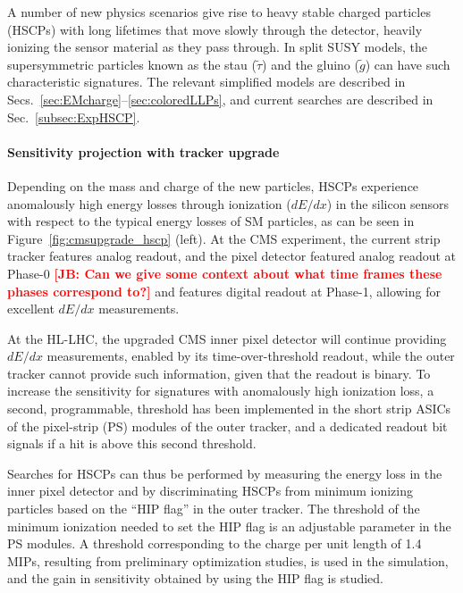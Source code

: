 A number of new physics scenarios give rise to heavy stable charged particles (HSCPs) with long lifetimes that move slowly through the detector, heavily ionizing the sensor material as they pass through. In split SUSY models, the supersymmetric particles known as the stau ($\tilde{\tau}$) and the gluino ($\tilde{g}$) can have such characteristic signatures. The relevant simplified models are described in Secs.~\ref{sec:EMcharge}--\ref{sec:coloredLLPs}, and current searches are described in Sec.~\ref{subsec:ExpHSCP}.

\paragraph{Sensitivity projection with tracker upgrade} 

Depending on the mass and charge of the new particles, HSCPs experience anomalously high energy losses through ionization ($dE/dx$) in the silicon sensors with respect to the typical energy losses of SM particles, as can be seen in Figure~\ref{fig:cmsupgrade_hscp} (left). At the CMS experiment, the current strip tracker features analog readout, and the pixel detector featured analog readout at Phase-0 {\bf \textcolor{red}{[JB: Can we give some context about what time frames these phases correspond to?]}} and features digital readout at Phase-1, allowing for excellent $dE/dx$ measurements.

At the HL-LHC, the upgraded CMS inner pixel detector will continue providing $dE/dx$ measurements, enabled by its time-over-threshold readout, while the outer tracker cannot provide such information, given that the readout is binary. To increase the sensitivity for signatures with anomalously high ionization loss, a second, programmable, threshold has been implemented in the short strip ASICs of the pixel-strip (PS) modules of the outer tracker, and a dedicated readout bit signals if a hit is above this second threshold.  

Searches for HSCPs can thus be performed by measuring the energy loss in the inner pixel detector and by discriminating HSCPs from minimum ionizing particles based on the ``HIP flag'' in the outer tracker. The threshold of the minimum ionization needed to set the HIP flag is an adjustable parameter in the PS modules. A threshold corresponding to the charge per unit length of 1.4 MIPs, resulting from preliminary optimization studies, is used in the simulation, and the gain in sensitivity obtained by using the HIP flag is studied.

